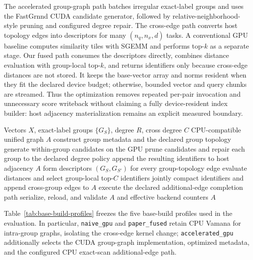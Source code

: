 \documentclass[sigconf,review,anonymous]{acmart}
\begin{document}
The accelerated group-graph path batches irregular exact-label groups and uses
the FastGrnnd CUDA candidate generator, followed by
relative-neighborhood-style pruning and configured degree repair.  The
cross-edge path converts host topology edges into descriptors for many
$(n_q,n_x,d)$ tasks.  A conventional GPU baseline computes similarity tiles
with SGEMM and performs top-$k$ as a separate stage.  Our fused path consumes
the descriptors directly, combines distance evaluation with group-local
top-$k$, and returns identifiers only because cross-edge distances are not
stored.  It keeps the base-vector array and norms resident when they fit the
declared device budget; otherwise, bounded vector and query chunks are
streamed.  Thus the optimization removes repeated per-pair invocation and
unnecessary score writeback without claiming a fully device-resident index
builder: host adjacency materialization remains an explicit measured
boundary.

\begin{algorithm}[t]
\caption{Accelerated construction of the base unified graph}
\label{alg:gpu-base-build}
\begin{algorithmic}[1]
\Require Vectors $X$, exact-label groups $\{G_S\}$, degree $R$, cross degree $C$
\Ensure CPU-compatible unified graph $A$
\State construct group metadata and the declared group topology
  \State generate within-group candidates on the GPU
  \State prune candidates and repair each group to the declared degree policy
  \State append the resulting identifiers to host adjacency $A$
\EndFor
\State form descriptors $(G_S,G_{S'})$ for every group-topology edge
  \State evaluate distances and select group-local top-$C$ identifiers jointly
  \State compact identifiers and append cross-group edges to $A$
\EndFor
\State execute the declared additional-edge completion path
\State serialize, reload, and validate $A$ and effective backend counters
\State \Return $A$
\end{algorithmic}
\end{algorithm}

Table~\ref{tab:base-build-profiles} freezes the five base-build profiles used
in the evaluation.  In particular, \texttt{naive\_gpu} and
\texttt{paper\_fused} retain CPU Vamana for intra-group graphs, isolating the
cross-edge kernel change; \texttt{accelerated\_\allowbreak gpu} additionally selects the
CUDA group-graph implementation, optimized metadata, and the configured CPU
exact-scan additional-edge path.
\end{document}
